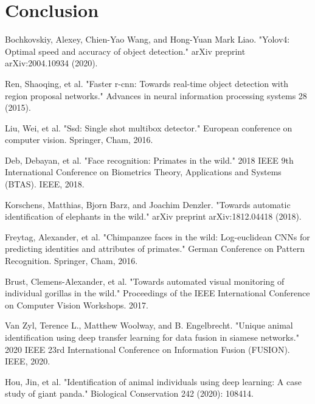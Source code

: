 \documentclass[10pt,twocolumn,letterpaper]{article}
\begin{document}
\section{Conclusion}
\label{sec:conclusion}








\begin{thebibliography}{99}

	Bochkovskiy, Alexey, Chien-Yao Wang, and Hong-Yuan Mark Liao. "Yolov4: Optimal speed and accuracy of object detection." arXiv preprint arXiv:2004.10934 (2020).
	
	Ren, Shaoqing, et al. "Faster r-cnn: Towards real-time object detection with region proposal networks." Advances in neural information processing systems 28 (2015).
	

	Liu, Wei, et al. "Ssd: Single shot multibox detector." European conference on computer vision. Springer, Cham, 2016.


	Deb, Debayan, et al. "Face recognition: Primates in the wild." 2018 IEEE 9th International Conference on Biometrics Theory, Applications and Systems (BTAS). IEEE, 2018. 


	Korschens, Matthias, Bjorn Barz, and Joachim Denzler. "Towards automatic identification of elephants in the wild." arXiv preprint arXiv:1812.04418 (2018). 


	Freytag, Alexander, et al. "Chimpanzee faces in the wild: Log-euclidean CNNs for predicting identities and attributes of primates." German Conference on Pattern Recognition. Springer, Cham, 2016. 


	Brust, Clemens-Alexander, et al. "Towards automated visual monitoring of individual gorillas in the wild." Proceedings of the IEEE International Conference on Computer Vision Workshops. 2017. 


	Van Zyl, Terence L., Matthew Woolway, and B. Engelbrecht. "Unique animal identification using deep transfer learning for data fusion in siamese networks." 2020 IEEE 23rd International Conference on Information Fusion (FUSION). IEEE, 2020. 


	Hou, Jin, et al. "Identification of animal individuals using deep learning: A case study of giant panda." Biological Conservation 242 (2020): 108414. 



\end{thebibliography}
\end{document}
